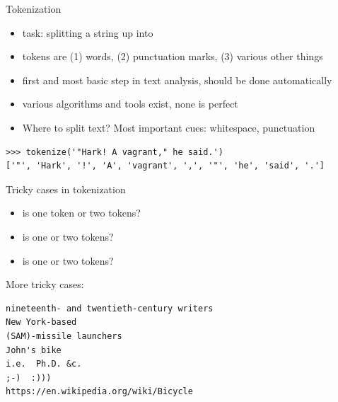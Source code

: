 \documentclass[aspectratio=169,usenames,dvipsnames]{beamer}
\begin{document}
\begin{frame}[fragile]{Tokenization}
 \begin{itemize}
  \item task: splitting a string up into 
  \item tokens are (1) words, (2) punctuation marks, (3) various other things
  \item first and most basic step in text analysis,
        should be done automatically
  \item various algorithms and tools exist, none is perfect
  \item Where to split text? Most important cues: whitespace, punctuation
 \end{itemize}
 \begin{lstlisting}
>>> tokenize('"Hark! A vagrant," he said.')
['"', 'Hark', '!', 'A', 'vagrant', ',', '"', 'he', 'said', '.']
 \end{lstlisting}
\end{frame}

\begin{frame}[fragile]{Tricky cases in tokenization}
 \begin{itemize}
  \item is  one token or two tokens?
  \item is  one or two tokens?
  \item is  one or two tokens?
 \end{itemize}

\pause
More tricky cases:
\begin{verbatim}
nineteenth- and twentieth-century writers
New York-based
(SAM)-missile launchers
John's bike
i.e.  Ph.D. &c.
;-)  :)))
https://en.wikipedia.org/wiki/Bicycle
\end{verbatim}
\end{frame}


%
%
%
\end{document}
